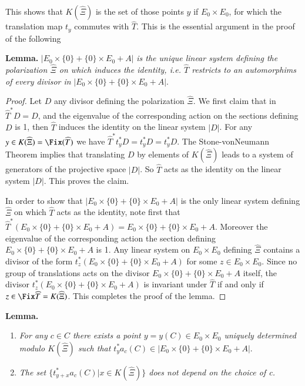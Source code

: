 This shows that $K(\widehat{\Xi})$ is the set of those points $y$ if $E_{0} \times E_{0}$, for which the translation map $t_{y}$ commutes with $\widehat{T}$.  This is the essential argument in the proof of the following

\medskip
\noindent
{\bfseries {} Lemma.\label{chap11-lemma-5.6}} $|E_{0} \times \{0\} + \{0\} \times E_{0} + A|$ \textit{is the unique linear system defining the polarization $\widehat{\Xi}$ on which induces the identity, i.e. $\widehat{T}$ restricts to an automorphims of every divisor in} $|E_{0} \times \{0\} + \{0\} \times E_{0} + A|$.

\begin{proof}
Let $D$ any divisor defining the polarization $\widehat{\Xi}$. We first claim that in $\widehat{T}^{*}D =D$, and the eigenvalue of the corresponding action on the sections defining $D$ is 1, then $\widehat{T}$ induces the identity on the linear system $|D|$. For any $y\in K (\widehat{\Xi}) =\Fix(\widehat{T})$ we have $\widehat{T}^{*}t_{y}^{*}D = t_{y}^{*}D=t_{y}^{*}D$. The Stone-vonNeumann Theorem implies that translating $D$ by elements of $K(\widehat{\Xi})$ leads to a system of generators of the projective space $|D|$. So $\widehat{T}$ acts as the identity on the linear system $|D|$. This proves the claim.

In order to show that $|E_{0} \times \{0\} + \{0\} \times E_{0} + A|$ is the only linear system defining $\widehat{\Xi}$ on which $\widehat{T}$ acts as the identity, note first that $\widehat{T}^{*}(E_{0} \times \{0\} + \{0\} \times E_{0} + A)=E_{0} \times \{0\} + \{0\} \times E_{0} + A$. Moreover the eigenvalue of the corresponding action the section defining $E_{0} \times \{0\} + \{0\} \times E_{0} + A$ is 1. Any linear system on $E_{0}\times E_{0}$ defining $\widehat{\Xi}$ contains a divisor of the form $t_{z}^{*}(E_{0} \times \{0\} + \{0\} \times E_{0} + A)$ for some $z \in E_{0} \times E_{0}$. Since no group of translations acts on the divisor $E_{0}\times \{0\} + \{0\} \times E_{0}+ A$ itself, the divisor $t_{z}^{*}(E_{0}\times\{0\} + \{0\} \times E_{0} + A)$ is invariant under $\widehat{T}$ if and only if $z \in \Fix\widehat{T}= K(\widehat{\Xi})$. This completes the proof of the lemma.
\end{proof}

\newpage

\medskip
\noindent
{\bfseries {} Lemma.\label{chap11-lemma-5.7}}

\begin{enumerate}[{\it a)}]

\item \textit{For any $c \in C $ there exists a point $y =y(C) \in E_{0} \times E_{0}$ uniquely determined modulo $K(\widehat{\Xi})$ such that $t_{y}^{*}a_{c}(C) \in | E_{0} \times \{0\} +\{0\} \times E_{0} + A|$}.

\item \textit{The set $\{t_{y+x}^{*}a_{c}(C) | x \in K (\widehat{\Xi})\}$ does not depend on the choice of c.}
\end{enumerate}

